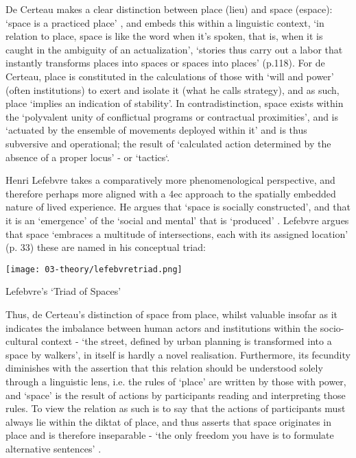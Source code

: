 De Certeau makes a clear distinction between place (lieu) and space (espace): `space is a practiced place' \citeyearpar[p. 117]{decerteau1984}, and embeds this within a linguistic context, `in relation to place, space is like the word when it's spoken, that is, when it is caught in the ambiguity of an actualization', `stories thus carry out a labor that instantly transforms places into spaces or spaces into places' (p.118). For de Certeau, place is constituted in the calculations of those with `will and power' (often institutions) to exert and isolate it (what he calls strategy), and as such, place `implies an indication of stability'. In contradistinction, space exists within the `polyvalent unity of conflictual programs or contractual proximities', and is `actuated by the ensemble of movements deployed within it' and is thus subversive and operational; the result of `calculated action determined by the absence of a proper locus' - or `tactics`. 

Henri Lefebvre takes a comparatively more phenomenological perspective, and therefore perhaps more aligned with a \gls{4ec} approach to the spatially embedded nature of lived experience. He argues that `space is socially constructed', and that it is an `emergence' of the `social and mental' that is `produced' \citeyearpar[p. 260]{lefebvre1991}. Lefebvre argues that space `embraces a multitude of intersections, each with its assigned location' (p. 33) these are named in his conceptual triad:

\begin{table}[ht]
    \centering
    \texttt{[image: 03-theory/lefebvretriad.png]}
    \caption{Lefebvre's `Triad of Spaces' \citep[in][]{gunzel2019}}\label{fig: lefebvretriad}
\end{table}

Thus, de Certeau's distinction of space from place, whilst valuable insofar as it indicates the imbalance between human actors and institutions within the socio-cultural context - `the street, defined by urban planning is transformed into a space by walkers', in itself is hardly a novel realisation. Furthermore, its fecundity diminishes with the assertion that this relation should be understood solely through a linguistic lens, i.e. the rules of `place' are written by those with power, and `space' is the result of actions by participants reading and interpreting those rules. To view the relation as such is to say that the actions of participants must always lie within the diktat of place, and thus asserts that space originates in place and is therefore inseparable - `the only freedom you have is to formulate alternative sentences' \citep{vermeulen2015}. 

